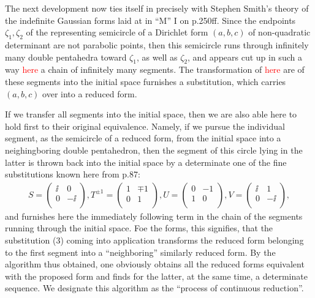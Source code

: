 The next development now ties itself in precisely with Stephen Smith’s theory of the indefinite Gaussian forms laid at in “M” I on p.250ff. Since the endpoints $\zeta_1, \zeta_2$ of the representing semicircle of a Dirichlet form $(a,b,c)$ of non-quadratic determinant are not parabolic points, then this semicircle runs through infinitely many double pentahedra toward $\zeta_1$, as well as $\zeta_2$, and appears cut up in such a way \textcolor{red}{here} a chain of infinitely many segments. The transformation of \textcolor{red}{here} are of these segments into the initial space furnishes a substitution, which carries $(a,b,c)$ over into a reduced form.

If we transfer all segments into the initial space, then we are also able here to hold first to their original equivalence. Namely, if we pursue the individual segment, as the semicircle of a reduced form, from the initial space into a neighingboring double pentahedron, then the segment of this circle lying in the latter is thrown back into the initial space by a determinate one of the fine substitutions known here from p.87:
\begin{align}
    S=\left(\begin{array}{cc}
    \ii & 0\\
    0 & -\ii\\
    \end{array}\right), 
    T^{\pm 1}=\left(\begin{array}{cc}
    1 & \mp 1\\
    0 & 1\\
    \end{array}\right), 
    U=\left(\begin{array}{cc}
    0 & -1\\
    1 & 0\\
    \end{array}\right), 
    V=\left(\begin{array}{cc}
    \ii & 1\\
    0 & -\ii\\
    \end{array}\right),
\end{align}
and furnishes here the immediately following term in the chain of the segments running through the initial space. Foe the forms, this signifies, that the substitution (3) coming into application transforms the reduced form belonging to the first segment into a “neighboring” similarly reduced form. By the algorithm thus obtained, one obviously obtains all the reduced forms equivalent with the proposed form and finds for the latter, at the same time, a determinate sequence. We designate this algorithm as the “process of continuous reduction”.

